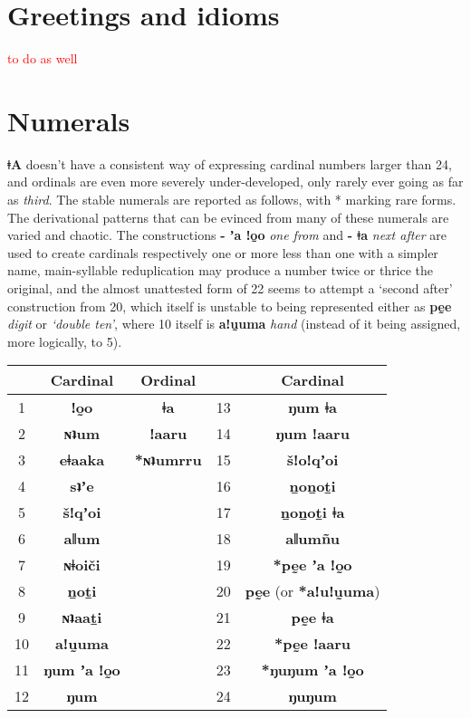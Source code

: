 \documentclass[11pt,a5paper]{book}
\newcommand{\qcn}[1]{\textcolor{AccentText}{\large\textbf{#1}}}
\newcommand{\langname}{\qcn{ǂA}}
\newcommand{\transl}[2]{\qcn{#1} \emph{#2}}
\newcommand{\cmnt}[1]{\textcolor{red}{#1}}
\begin{document}
\section{Greetings and idioms}

\cmnt{to do as well}

\section{Numerals}

\langname{} doesn't have a consistent way of expressing cardinal numbers larger than 24, and ordinals are even more severely under-developed, only rarely ever going as far as \emph{third}. The stable numerals are reported as follows, with * marking rare forms. The derivational patterns that can be evinced from many of these numerals are varied and chaotic. The constructions \transl{- ʼa ǃo̰o}{one from} and \transl{- ǂa}{next after} are used to create cardinals respectively one or more less than one with a simpler name, main-syllable reduplication may produce a number twice or thrice the original, and the almost unattested form of 22 seems to attempt a `second after' construction from 20, which itself is unstable to being represented either as \transl{pḛe}{digit} or \emph{`double ten'}, where 10 itself is \transl{aǃṵuma}{hand} (instead of it being assigned, more logically, to 5).

\begin{center}

\begin{tabular}{ccccc}
\hline
& Cardinal & Ordinal & & Cardinal\\ \hline \hline
1 & \qcn{ǃo̰o} & \qcn{ǂa} & 13 & \qcn{ŋum ǂa} \\ \hline
2 & \qcn{ɴʇum} & \qcn{ǃaaru} & 14  &  \qcn{ŋum ǃaaru} \\ \hline
3 & \qcn{eǂaaka} & \qcn{*ɴʇumrru} & 15 & \qcn{šǃoǃqʼoi} \\ \hline
4 & \qcn{sʇʼe} & & 16 & \qcn{ṉoṉoṯi} \\ \hline
5 & \qcn{šǃqʼoi} & & 17 & \qcn{ṉoṉoṯi ǂa} \\ \hline
6 & \qcn{aǁum} & & 18 & \qcn{aǁumñu}  \\ \hline
7 & \qcn{ɴǂoiči} & & 19 & \qcn{*pḛe ʼa ǃo̰o}\\ \hline
8 & \qcn{ṉoṯi} && 20 & \qcn{pḛe} (or \qcn{*aǃuǃṵuma})\\ \hline
9 & \qcn{ɴʇaaṯi} & & 21 & \qcn{pḛe ǂa} \\ \hline
10 & \qcn{aǃṵuma} & & 22 & \qcn{*pḛe ǃaaru} \\ \hline
11 & \qcn{ŋum ʼa ǃo̰o} & & 23 & \qcn{*ŋuŋum ʼa ǃo̰o} \\ \hline
12 & \qcn{ŋum}  & & 24 & \qcn{ŋuŋum} \\ \hline 
\end{tabular}

\end{center}
\end{document}
